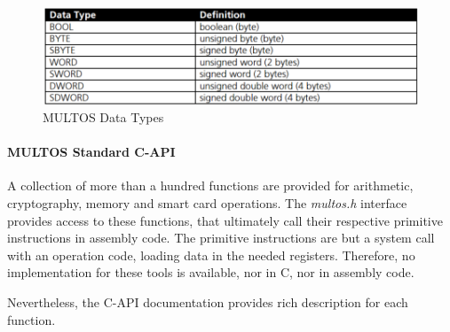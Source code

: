 \begin{figure}[bth]
	\begin{center}
		\includegraphics[width=\linewidth]{gfx/multosDataTypes}
	\end{center}
	\caption{MULTOS Data Types}
	\label{fig:multosDataTypes}
\end{figure}


\paragraph{MULTOS Standard C-API}

A collection of more than a hundred functions are provided for arithmetic, cryptography, memory and smart card operations. The \textit{multos.h} interface provides access to these functions, that ultimately call their respective primitive instructions in assembly code. The primitive instructions are but a system call with an operation code, loading data in the needed registers. Therefore,  no implementation for these tools is available, nor in C, nor in assembly code.

Nevertheless, the C-API documentation \citep{MultosTechLib} provides rich description for each function.



